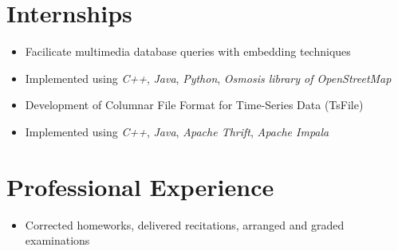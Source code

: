 \documentclass{resume}
\begin{document}
\section{Internships}

\begin{itemize}
  \item Facilicate multimedia database queries with embedding techniques
  \item Implemented using \emph{C++}, \emph{Java}, \emph{Python}, \emph{Osmosis library of OpenStreetMap}
\end{itemize}

\begin{itemize}
  \item Development of Columnar File Format for Time-Series Data (TsFile)
  \item Implemented using \emph{C++}, \emph{Java}, \emph{Apache Thrift}, \emph{Apache Impala}
\end{itemize}
% 
% 

\section{Professional Experience}
\begin{itemize}
  \item Corrected homeworks, delivered recitations, arranged and graded examinations
\end{itemize}
% 
% 
\end{document}
